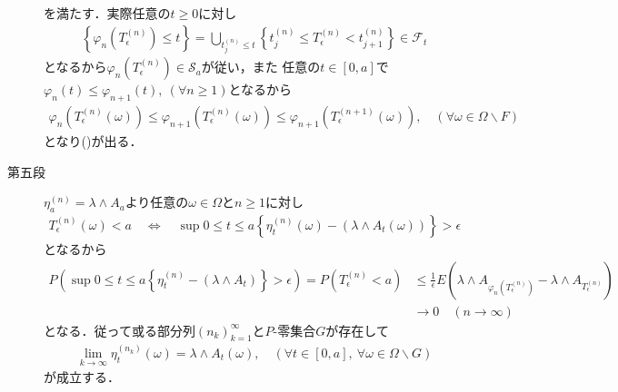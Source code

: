 \begin{prf}
\begin{description}
\begin{align}
				\end{align}
				を満たす．実際任意の$t \geq 0$に対し
				\begin{align}
					\left\{\varphi_n\left(T^{(n)}_\epsilon\right) \leq t\right\}
					= \bigcup_{t^{(n)}_j \leq t} \left\{t^{(n)}_j \leq T^{(n)}_\epsilon < t^{(n)}_{j+1}\right\}
					\in \mathscr{F}_t
				\end{align}
				となるから$\varphi_n\left(T^{(n)}_\epsilon\right) \in \mathscr{S}_a$が従い，また
				任意の$t \in [0,a]$で$\varphi_n(t) \leq \varphi_{n+1}(t),\ (\forall n \geq 1)$となるから
				\begin{align}
					\varphi_n \left(T^{(n)}_\epsilon(\omega)\right)
					\leq \varphi_{n+1} \left(T^{(n)}_\epsilon(\omega)\right)
					\leq \varphi_{n+1} \left(T^{(n+1)}_\epsilon(\omega)\right),
					\quad (\forall \omega \in \Omega \backslash F)
				\end{align}
				となり()が出る．
			
			\item[第五段]
				$\eta^{(n)}_a = \lambda \wedge A_a$より任意の$\omega \in \Omega$と$n \geq 1$に対し
				\begin{align}
					T^{(n)}_\epsilon(\omega) < a
					\quad \Longleftrightarrow \quad
					\sup{0 \leq t \leq a}{\left\{\eta^{(n)}_t(\omega) - (\lambda \wedge A_t(\omega))\right\}} > \epsilon
				\end{align}
				となるから
				\begin{align}
					P\left(\sup{0 \leq t \leq a}{\left\{\eta^{(n)}_t-(\lambda \wedge A_t)\right\}} > \epsilon\right)
					= P\left(T^{(n)}_\epsilon < a\right)
					&\leq \frac{1}{\epsilon} E\left(\lambda \wedge A_{\varphi_n\left(T^{(n)}_\epsilon\right)}
						- \lambda \wedge A_{T^{(n)}_\epsilon} \right) \\
					&\longrightarrow 0 \quad (n \longrightarrow \infty)
				\end{align}
				となる．従って或る部分列$(n_k)_{k=1}^\infty$と$P$-零集合$G$が存在して
				\begin{align}
					\lim_{k \to \infty} \eta^{(n_k)}_t(\omega) = \lambda \wedge A_t(\omega),
					\quad (\forall t \in [0,a],\ \forall \omega \in \Omega \backslash G)
				\end{align}
				が成立する．
				

\end{description}
\end{prf}
